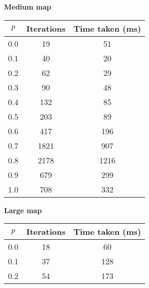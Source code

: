 \begin{table}[!htb]
    \begin{minipage}{0.5\textwidth}
        \centering
        \textbf{Medium map}\\
        \begin{tabular}{@{}c|cc@{}}
        \toprule
        \textbf{$p$} & \textbf{Iterations} & \textbf{Time taken (ms)} \\ \midrule
        0.0          & 19                            & 51                       \\
        0.1          & 40                            & 20                       \\
        0.2          & 62                            & 29                       \\
        0.3          & 90                            & 48                       \\
        0.4          & 132                           & 85                       \\
        0.5          & 203                           & 89                       \\
        0.6          & 417                           & 196                      \\
        0.7          & 1821                          & 907                      \\
        0.8          & 2178                          & 1216                     \\
        0.9          & 679                           & 299                      \\
        1.0          & 708                           & 332                      \\ \bottomrule
        \end{tabular}
    \end{minipage}
    \hfillx
    \begin{minipage}{0.5\textwidth}
        \centering
        \textbf{Large map}\\
        \begin{tabular}{@{}c|cc@{}}
        \toprule
        \textbf{$p$} & \textbf{Iterations} & \textbf{Time taken (ms)} \\ \midrule
        0.0          & 18                  & 60                       \\
        0.1          & 37                  & 128                      \\
        0.2          & 54                  & 173                      \\

\end{tabular}
\end{minipage}
\end{table}
